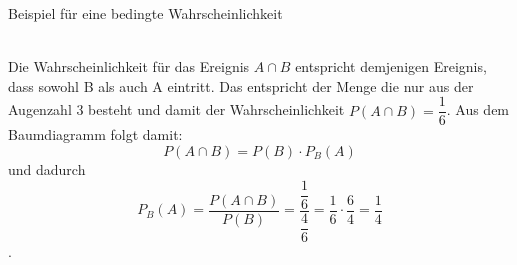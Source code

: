 \begin{bsp}{Beispiel für eine bedingte Wahrscheinlichkeit}{}
{}\\
Die Wahrscheinlichkeit für das Ereignis $A\cap B$ entspricht demjenigen Ereignis, dass sowohl B als auch A eintritt. Das entspricht der Menge die nur aus der Augenzahl 3 besteht und damit der Wahrscheinlichkeit $P(A\cap B) = \dfrac{1}{6}$. Aus dem Baumdiagramm folgt damit: $$P(A\cap B) = P(B) \cdot P_{B}(A)$$ und dadurch $$P_{B}(A) = \dfrac{P(A\cap B)}{P(B)} = \dfrac{\dfrac{1}{6}}{\dfrac{4}{6}}= \dfrac{1}{6} \cdot \dfrac{6}{4} = \dfrac{1}{4} $$.
\end{bsp}